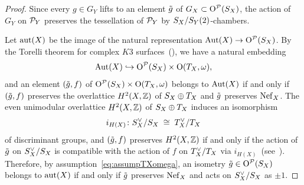 \documentclass{amsart}
\numberwithin{procedure}{section}
\begin{document}
%
%
\begin{proof}
Since every $g\in G_Y$ lifts to an element $\tilde{g}$ of $G_X\subset \mathord{\mathrm{O}}^{\mathord{\mathcal P}}(S_{X})$,
the action of $G_Y$ on $\mathord{\mathcal P}_Y$ preserves the tessellation of $\mathord{\mathcal P}_Y$ by $S_{X}/S_{Y}(2)$-chambers.
\par
Let $\mathord{\rm{aut}}(X)$ be the image of the natural representation $\operatorname{\mathrm{Aut}}\nolimits(X)\to \mathord{\mathrm{O}}^{\mathord{\mathcal P}}(S_{X})$.
By the Torelli theorem for complex $K3$ surfaces~(\cite[Chapter~VIII]{CCSBook}),
we have a natural embedding 
%
\begin{equation}\label{eq:AutX}
\operatorname{\mathrm{Aut}}\nolimits(X)\hookrightarrow \mathord{\mathrm{O}}^{\mathord{\mathcal P}}(S_{X})\times \mathord{\mathrm{O}}(T_X, \omega),
\end{equation}
%
and  an element 
$(\tilde{g},  f)$ of $\mathord{\mathrm{O}}^{\mathord{\mathcal P}}(S_{X})\times \mathord{\mathrm{O}}(T_X, \omega)$ belongs to $\operatorname{\mathrm{Aut}}\nolimits(X)$
if and only if 
$(\tilde{g},  f)$ preserves the overlattice $H^2(X, \mathord{\mathbb Z})$ of $S_{X}\oplus T_X$ and 
$\tilde{g}$ preserves $\mathord{\rm Nef}_{X}$.
The even unimodular overlattice $H^2(X, \mathord{\mathbb Z})$ of $S_{X}\oplus T_X$
induces an isomorphism
\[
i_{H(X)} \colon S_{X}\sp{\vee}/S_{X}\;\cong\; T_X\sp{\vee}/T_X
\]
of discriminant groups, and 
$(\tilde{g},  f)$ preserves  $H^2(X, \mathord{\mathbb Z})$ 
if and only if the action of $\tilde{g}$ on $S_{X}\sp{\vee}/S_{X}$ is compatible with the action 
of $f$ on $T_X\sp{\vee}/T_X$ via $i_{H(X)} $~(see~\cite{Nikulin79}).
Therefore, by  assumption~\eqref{eq:assumpTXomega},
an isometry $\tilde{g}\in \mathord{\mathrm{O}}^{\mathord{\mathcal P}}(S_{X})$ belongs to $\mathord{\rm{aut}}(X)$ 
if and only if $\tilde{g}$ preserves $\mathord{\rm Nef}_{X}$ and  acts on $S_{X}\sp{\vee}/S_{X}$  as $\pm 1$.


\end{proof}
\end{document}

